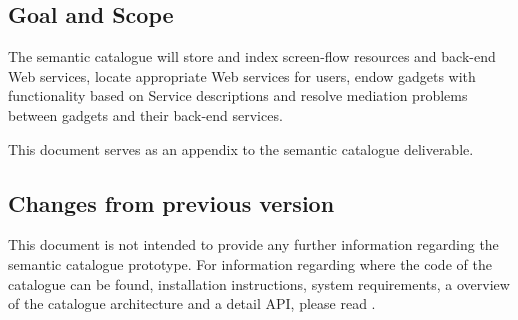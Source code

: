 \documentclass{fast_latex}
\begin{document}
\subsection{Goal and Scope} %
\label{sub:goal_and_scope}

The semantic catalogue will store and index screen-flow resources and back-end Web services, locate appropriate Web services for users, endow gadgets with functionality based on Service descriptions and resolve mediation problems between gadgets and their back-end services.

This document serves as an appendix to the semantic catalogue deliverable.


\subsection{Changes from previous version} %
\label{sub:changes_from_previous_version}

This document is not intended to provide any further information regarding the semantic catalogue prototype. For information regarding where the code of the catalogue can be found, installation instructions, system requirements, a overview of the catalogue architecture and a detail API, please read \cite{palaguita2010_usermanual}.



\clearpage


\end{document}
